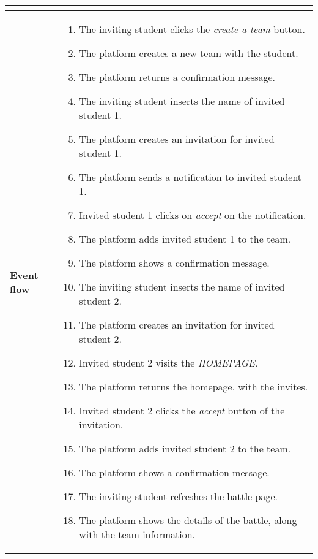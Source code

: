 \begin{enumerate}[label=\textbf{UC\arabic*}:,leftmargin=1.3cm]
\begin{table}[H]
\begin{tabular}{|l|p{11.9cm}|}
\begin{itemize}
                        \end{itemize}                           \\\hline
                        \textbf{Event flow}      &
                        \begin{enumerate}[label=\arabic*.]
                              \item The inviting student clicks the \emph{create a team} button.
                              \item The platform creates a new team with the student.
                              \item The platform returns a confirmation message.
                              \item The inviting student inserts the name of invited student 1.
                              \item The platform creates an invitation for invited student 1.
                              \item The platform sends a notification to invited student 1.
                              \item Invited student 1 clicks on \emph{accept} on the notification.
                              \item The platform adds invited student 1 to the team.
                              \item The platform shows a confirmation message.
                              \item The inviting student inserts the name of invited student 2.
                              \item The platform creates an invitation for invited student 2.
                              \item Invited student 2 visits the \emph{HOMEPAGE}.
                              \item The platform returns the homepage, with the invites.
                              \item Invited student 2 clicks the \emph{accept} button of the invitation.
                              \item The platform adds invited student 2 to the team.
                              \item The platform shows a confirmation message.
                              \item The inviting student refreshes the battle page.
                              \item The platform shows the details of the battle, along with the team information.

\end{enumerate}
\end{tabular}
\end{table}
\end{enumerate}
